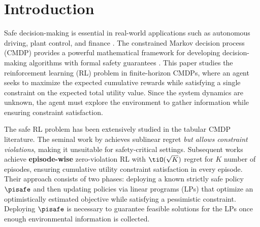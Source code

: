 \section{Introduction}

Safe decision-making is essential in real-world applications such as autonomous driving, plant control, and finance \citep{gu2022review}. 
The constrained Markov decision process (CMDP) provides a powerful mathematical framework for developing decision-making algorithms with formal safety guarantees \citep{altman1999constrained}. 
This paper studies the reinforcement learning (RL) problem in finite-horizon CMDPs, where an agent seeks to maximize the expected cumulative rewards while satisfying a single constraint on the expected total utility value.
Since the system dynamics are unknown, the agent must explore the environment to gather information while ensuring constraint satisfaction.

The safe RL problem has been extensively studied in the tabular CMDP literature.
The seminal work by \citet{efroni2020exploration} achieves sublinear regret {\em but allows constraint violations}, making it unsuitable for safety-critical settings.
Subsequent works \citep{liu2021learning,bura2022dope} achieve \textbf{episode-wise} zero-violation RL with $\tiO(\sqrt{K})$ regret for $K$ number of episodes, ensuring cumulative utility constraint satisfaction in every episode.
Their approach consists of two phases: 
deploying a known strictly safe policy $\pisafe$ and then updating policies via linear programs (LPs) that optimize an optimistically estimated objective while satisfying a pessimistic constraint.
Deploying $\pisafe$ is necessary to guarantee feasible solutions for the LPs once enough environmental information is collected.

